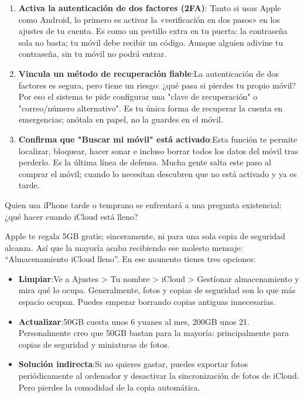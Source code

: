 \begin{enumerate}
  \item \textbf{Activa la autenticación de dos factores (2FA)}: Tanto si usas Apple como Android, lo primero es activar la «verificación en dos pasos» en los ajustes de tu cuenta. Es como un pestillo extra en tu puerta: la contraseña sola no basta; tu móvil debe recibir un código. Aunque alguien adivine tu contraseña, sin tu móvil no podrá entrar.
  \item \textbf{Vincula un método de recuperación fiable}:La autenticación de dos factores es segura, pero tiene un riesgo: ¿qué pasa si pierdes tu propio móvil? Por eso el sistema te pide configurar una "clave de recuperación" o "correo/número alternativo". Es tu única forma de recuperar la cuenta en emergencias; anótala en papel, no la guardes en el móvil.
  \item \textbf{Confirma que "Buscar mi móvil" está activado}:Esta función te permite localizar, bloquear, hacer sonar e incluso borrar todos los datos del móvil tras perderlo. Es la última línea de defensa. Mucha gente salta este paso al comprar el móvil; cuando lo necesitan descubren que no está activado y ya es tarde.
\end{enumerate}


Quien usa iPhone tarde o temprano se enfrentará a una pregunta existencial: ¿qué hacer cuando iCloud está lleno?

Apple te regala 5GB gratis; sinceramente, ni para una sola copia de seguridad alcanza. Así que la mayoría acaba recibiendo ese molesto mensaje: “Almacenamiento iCloud lleno”. En ese momento tienes tres opciones:

\begin{itemize}
  \item \textbf{Limpiar}:Ve a Ajustes > Tu nombre > iCloud > Gestíonar almacenamiento y mira qué lo ocupa. Generalmente, fotos y copias de seguridad son lo que más espacio ocupan. Puedes empezar borrando copias antiguas innecesarias.
  \item \textbf{Actualizar}:50GB cuesta unos 6 yuanes al mes, 200GB unos 21. Personalmente creo que 50GB bastan para la mayoría: principalmente para copias de seguridad y miniaturas de fotos.
  \item \textbf{Solución indirecta}:Si no quieres gastar, puedes exportar fotos periódicamente al ordenador y desactivar la sincronización de fotos de iCloud. Pero pierdes la comodidad de la copia automática.
\end{itemize}

